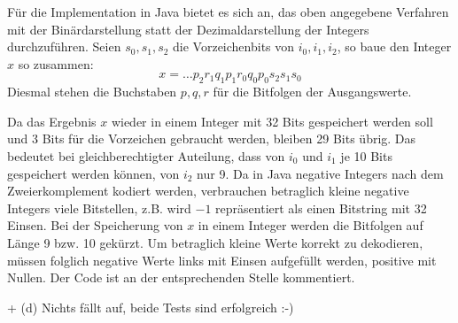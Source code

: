 \documentclass[a4paper,11pt]{article}             %
\begin{document}
\setcounter{excnt}{10}
\begin{ex}
\begin{exlist}
  \leavevmode
  \setcounter{exlisti}{1}
\item 
  Für die Implementation in Java bietet es sich an, das oben angegebene
  Verfahren mit der Binärdarstellung statt der Dezimaldarstellung der Integers
  durchzuführen. Seien $s_0, s_1, s_2$ die Vorzeichenbits von $i_0, i_1, i_2$,
  so baue den Integer $x$ so zusammen:
  \begin{equation*}
 x = \dots p_2r_1q_1p_1r_{0}q_{0}p_{0}s_2s_1s_0
  \end{equation*}
  Diesmal stehen die Buchstaben $p, q, r$ für die Bitfolgen der Ausgangswerte.

Da das Ergebnis $x$ wieder in einem Integer mit 32 Bits gespeichert werden soll
und 3 Bits für die Vorzeichen gebraucht werden, bleiben 29 Bits übrig.
Das bedeutet bei gleichberechtigter Auteilung, dass von $i_0$ und $i_1$ je 10
Bits gespeichert werden können, von $i_2$ nur 9.
Da in Java negative Integers nach dem Zweierkomplement kodiert werden, verbrauchen
betraglich kleine negative Integers viele Bitstellen, z.B. wird $-1$
repräsentiert als einen Bitstring mit 32 Einsen. Bei der Speicherung von $x$ in
einem Integer werden die Bitfolgen auf Länge 9 bzw. 10 gekürzt. Um betraglich
kleine Werte korrekt zu dekodieren, müssen folglich negative Werte links mit
Einsen aufgefüllt werden, positive mit Nullen. Der Code ist an der
entsprechenden Stelle kommentiert.
\item + (d) Nichts fällt auf, beide Tests sind erfolgreich :-) 
\end{exlist}
\end{ex}
\end{document}
